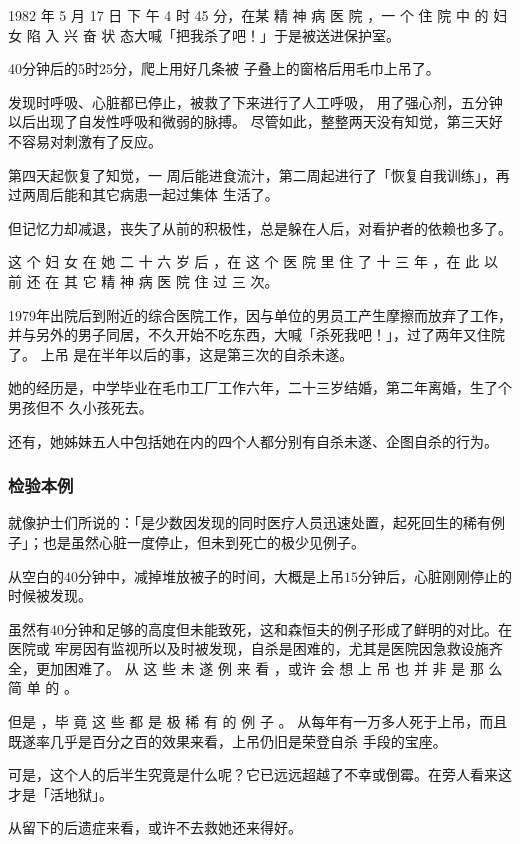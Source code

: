 \documentclass[UTF8]{ctexart}
\begin{document}
1982 年 5 月 17 日 下 午 4 时 45 分，在某 精 神 病 医 院 ，一 个 住 院 中 的 妇 女 陷 入 兴 奋 状 态大喊「把我杀了吧！」于是被送进保护室。

$40$分钟后的5时25分，爬上用好几条被 子叠上的窗格后用毛巾上吊了。

发现时呼吸、心脏都已停止，被救了下来进行了人工呼吸， 用了强心剂，五分钟以后出现了自发性呼吸和微弱的脉搏。 尽管如此，整整两天没有知觉，第三天好不容易对刺激有了反应。

第四天起恢复了知觉，一 周后能进食流汁，第二周起进行了「恢复自我训练」，再过两周后能和其它病患一起过集体 生活了。

但记忆力却减退，丧失了从前的积极性，总是躲在人后，对看护者的依赖也多了。

这 个 妇 女 在 她 二 十 六 岁 后 ，在 这 个 医 院 里 住 了 十 三 年 ，在 此 以 前 还 在 其 它 精 神 病 医 院 住 过 三 次。

1979年出院后到附近的综合医院工作，因与单位的男员工产生摩擦而放弃了工作， 并与另外的男子同居，不久开始不吃东西，大喊「杀死我吧！」，过了两年又住院了。
上吊 是在半年以后的事，这是第三次的自杀未遂。

她的经历是，中学毕业在毛巾工厂工作六年，二十三岁结婚，第二年离婚，生了个男孩但不 久小孩死去。

还有，她姊妹五人中包括她在内的四个人都分别有自杀未遂、企图自杀的行为。

\subsubsection*{检验本例}

就像护士们所说的：「是少数因发现的同时医疗人员迅速处置，起死回生的稀有例子」；也是虽然心脏一度停止，但未到死亡的极少见例子。

从空白的$40$分钟中，减掉堆放被子的时间，大概是上吊$15$分钟后，心脏刚刚停止的时候被发现。

虽然有$40$分钟和足够的高度但未能致死，这和森恒夫的例子形成了鲜明的对比。在医院或 牢房因有监视所以及时被发现，自杀是困难的，尤其是医院因急救设施齐全，更加困难了。 从 这 些 未 遂 例 来 看 ，或许 会 想 上 吊 也 并 非 是 那 么 简 单 的 。

但是 ，毕 竟 这 些 都 是 极 稀 有 的 例 子 。 从每年有一万多人死于上吊，而且既遂率几乎是百分之百的效果来看，上吊仍旧是荣登自杀 手段的宝座。

可是，这个人的后半生究竟是什么呢？它已远远超越了不幸或倒霉。在旁人看来这才是「活地狱」。

从留下的后遗症来看，或许不去救她还来得好。
\end{document}
